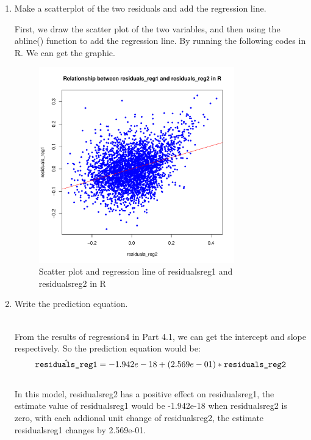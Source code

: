 \documentclass[12pt,letterpaper]{article}
\begin{document}
\begin{enumerate}
		\item Make a scatterplot of the two residuals and add the regression line. 	\vspace{.16cm}
		
			\noindent First, we draw the scatter plot of the two variables, and then using the abline() function to add the regression line. By running the following codes in R. We can get the graphic.
		
		
		
		\begin{figure}[h]
			\centering
			\includegraphics[width=0.8\textwidth]{Scatter plot and regression line of residuals_reg1 and residuals_reg2 in R.pdf}
			\caption{Scatter plot and regression line of residuals\textunderscore{}reg1 and residuals\textunderscore{}reg2 in R}
			\label{fig:pdf}
		\end{figure}
		\vspace{.15cm}
		
		\newpage
		\item Write the prediction equation.
		
		\noindent \\From the results of regression4 in Part 4.1, we can get the intercept and slope respectively. So the prediction equation would be:\\  \[ \hat{\texttt{residuals\textunderscore{}reg1}} = -1.942e-18 + (2.569e-01)*\texttt{residuals\textunderscore{}reg2} \]  \\In this model, residuals\textunderscore{}reg2 has a positive effect on residuals\textunderscore{}reg1, the estimate value of residuals\textunderscore{}reg1 would be -1.942e-18 when residuals\textunderscore{}reg2 is zero, with each addional unit change of residuals\textunderscore{}reg2, the estimate residuals\textunderscore{}reg1 changes by 2.569e-01.\\
		
	\end{enumerate}
	
\end{document}
